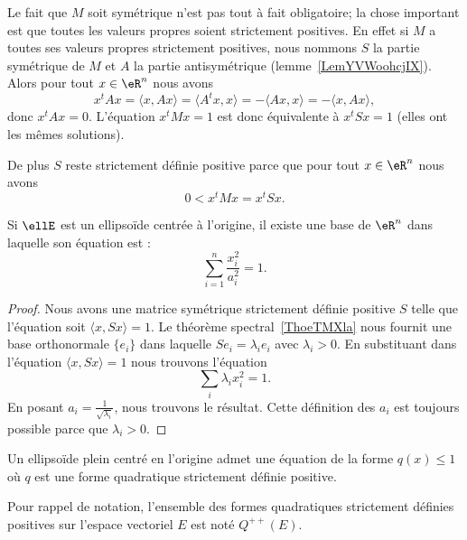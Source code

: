 \begin{remark}
    Le fait que \( M\) soit symétrique n'est pas tout à fait obligatoire; la chose important est que toutes les valeurs propres soient strictement positives. En effet si \( M\) a toutes ses valeurs propres strictement positives, nous nommons \( S\) la partie symétrique de \( M\) et \( A\) la partie antisymétrique (lemme~\ref{LemYVWoohcjIX}). Alors pour tout \( x\in \eR^n\) nous avons
    \begin{equation}
        x^tAx=\langle x, Ax\rangle =\langle A^tx,x \rangle =-\langle Ax, x\rangle =-\langle x,Ax\rangle ,
    \end{equation}
    donc \( x^tAx=0\). L'équation \( x^tMx=1\) est donc équivalente à \( x^tSx=1\) (elles ont les mêmes solutions).

    De plus \( S\) reste strictement définie positive parce que pour tout \( x\in \eR^n\) nous avons
    \begin{equation}
        0<x^tMx=x^tSx.
    \end{equation}
\end{remark}

\begin{proposition}\label{PropWDRooQdJiIr}
    Si \( \ellE\) est un ellipsoïde centrée à l'origine, il existe une base de \( \eR^n\) dans laquelle son équation est :
    \begin{equation}
        \sum_{i=1}^n\frac{ x_i^2 }{ a_i^2 }=1.
    \end{equation}
\end{proposition}

\begin{proof}
    Nous avons une matrice symétrique strictement définie positive \( S\) telle que l'équation soit \( \langle x, Sx\rangle =1\). Le théorème spectral~\ref{ThoeTMXla} nous fournit une base orthonormale \( \{ e_i \}\) dans laquelle \( Se_i=\lambda_ie_i\) avec \( \lambda_i>0\). En substituant dans l'équation \( \langle x, Sx\rangle =1\) nous trouvons l'équation
    \begin{equation}
        \sum_i\lambda_ix_i^2=1.
    \end{equation}
    En posant \( a_i=\frac{1}{ \sqrt{\lambda_i} }\), nous trouvons le résultat.  Cette définition des \( a_i\) est toujours possible parce que \( \lambda_i>0\).
\end{proof}

\begin{corollary}   \label{CorKGJooOmcBzh}
    Un ellipsoïde plein centré en l'origine admet une équation de la forme \( q(x)\leq 1\) où \( q\) est une forme quadratique strictement définie positive.
\end{corollary}
Pour rappel de notation, l'ensemble des formes quadratiques strictement définies positives sur l'espace vectoriel \( E\) est noté \( Q^{++}(E)\).

